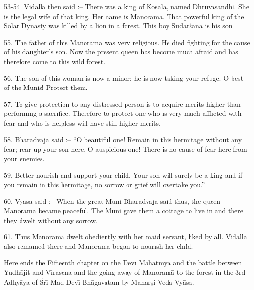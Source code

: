 53-54. Vidalla then said :-- There was a king of Kosala, named Dhruvasandhi. She is the legal wife of that king. Her name is Manoram\=a. That powerful king of the Solar Dynasty was killed by a lion in a forest. This boy Sudar\'sana is his son.

55. The father of this Manoram\=a was very religious. He died fighting for the cause of his daughter's son. Now the present queen has become much afraid and has therefore come to this wild forest.

56. The son of this woman is now a minor; he is now taking your refuge. O best of the Munis! Protect them.

57. To give protection to any distressed person is to acquire merits higher than performing a sacrifice. Therefore to protect one who is very much afflicted with fear and who is helpless will have still higher merits.

58. Bh\=aradv\=aja said :-- ``O beautiful one! Remain in this hermitage without any fear; rear up your son here. O auspicious one! There is no cause of fear here from your enemies.

59. Better nourish and support your child. Your son will surely be a king and if you remain in this hermitage, no sorrow or grief will overtake you.''

60. Vy\=asa said :-- When the great Muni Bh\=aradv\=aja said thus, the queen Manoram\=a became peaceful. The Muni gave them a cottage to live in and there they dwelt without any sorrow.

61. Thus Manoram\=a dwelt obediently with her maid servant, liked by all. Vidalla also remained there and Manoram\=a began to nourish her child.

Here ends the Fifteenth chapter on the Dev\={\i} M\=ah\=atmya and the battle between Yudh\=ajit and V\={\i}rasena and the going away of Manoram\=a to the forest in the 3rd Adhy\=aya of \'Sr\={\i} Mad Dev\={\i} Bh\=agavatam by Mahar\d{s}i Veda Vy\=asa.



